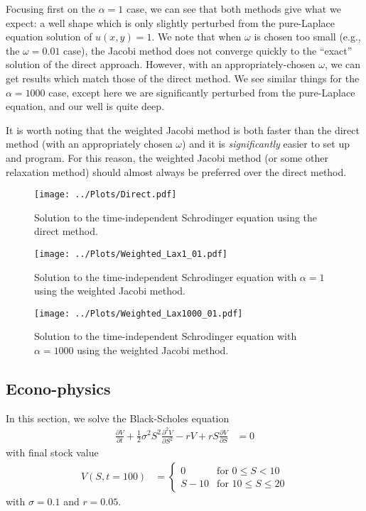 \documentclass[twocolumn]{myarticle}
\begin{document}
Focusing first on the $ \alpha = 1 $ case, we can see that both methods give what we expect: a well shape which is only slightly perturbed from the pure-Laplace equation solution of $ u(x,y) = 1 $.
We note that when $ \omega $ is chosen too small (e.g., the $ \omega = 0.01 $ case), the Jacobi method does not converge quickly to the ``exact'' solution of the direct approach.
However, with an appropriately-chosen $ \omega $, we can get results which match those of the direct method.
We see similar things for the $ \alpha = 1000 $ case, except here we are significantly perturbed from the pure-Laplace equation, and our well is quite deep.

It is worth noting that the weighted Jacobi method is both faster than the direct method (with an appropriately chosen $ \omega $) and it is \emph{significantly} easier to set up and program.
For this reason, the weighted Jacobi method (or some other relaxation method) should almost always be preferred over the direct method.

\begin{figure*}[ht]
    \centering
    \texttt{[image: ../Plots/Direct.pdf]}
    \caption{Solution to the time-independent Schrodinger equation using the direct method.}
    \label{fig:direct_method}
\end{figure*}

\begin{figure*}[ht]
    \centering
    \texttt{[image: ../Plots/Weighted\_Lax1\_01.pdf]}
    \caption{Solution to the time-independent Schrodinger equation with $ \alpha = 1 $ using the weighted Jacobi method.}
    \label{fig:weighted_jacobi_1}
\end{figure*}

\begin{figure*}[ht]
    \centering
    \texttt{[image: ../Plots/Weighted\_Lax1000\_01.pdf]}
    \caption{Solution to the time-independent Schrodinger equation with $ \alpha = 1000 $ using the weighted Jacobi method.}
    \label{fig:weighted_jacobi_1000}
\end{figure*}

\subsection{Econo-physics}
\label{subsec:econo_physics}

In this section, we solve the Black-Scholes equation
\begin{align}
    \frac{\partial V}{\partial t} + \frac{1}{2} \sigma^2 S^2 \frac{\partial^2 V}{\partial S^2} - rV + r S \frac{\partial V}{\partial S} &= 0
\end{align}
with final stock value
\begin{align}
V(S, t=100) &= \begin{cases} 0 & \text{for } 0 \leq S < 10 \\ S-10 & \text{for } 10 \leq S \leq 20 \end{cases}
\end{align}
with $ \sigma = 0.1 $ and $ r = 0.05 $.
\end{document}
